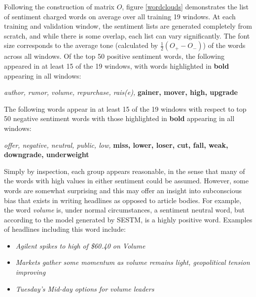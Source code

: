 Following the construction of matrix $O$, figure \ref{wordclouds} demonstrates the list of sentiment charged words on average over all training 19 windows. At each training and validation window, the sentiment lists are generated completely from scratch, and while there is some overlap, each list can vary significantly. The font size corresponds to the average tone (calculated by $\frac{1}{2}(O_+ - O_-)$) of the words across all windows. Of the top 50 positive sentiment words, the following appeared in at least 15 of the 19 windows, with words highlighted in \textbf{bold} appearing in all windows:
\begin{center}
      \textit{author, rumor, volume, repurchase, rais(e),} \textbf{gainer, mover, high, upgrade}
\end{center}

\noindent
The following words appear in at least 15 of the 19 windows with respect to top 50 negative sentiment words with those highlighted in \textbf{bold} appearing in all windows:
\begin{center}
      \textit{offer, negative, neutral, public, low,} \textbf{miss, lower, loser, cut, fall, weak, downgrade, underweight}
\end{center}

Simply by inspection, each group appears reasonable, in the sense that many of the words with high values in either sentiment could be assumed. However, some words are somewhat surprising and this may offer an insight into subconscious bias that exists in writing headlines as opposed to article bodies. For example, the word \textit{volume} is, under normal circumstances, a sentiment neutral word, but according to the model generated by SESTM, is a highly positive word. Examples of headlines including this word include:
\begin{itemize}
      \item \textit{Agilent spikes to high of \$60.40 on Volume}
      \item \textit{Markets gather some momentum as volume remains light, geopolitical tension improving}
      \item \textit{Tuesday's Mid-day options for volume leaders}
\end{itemize}

